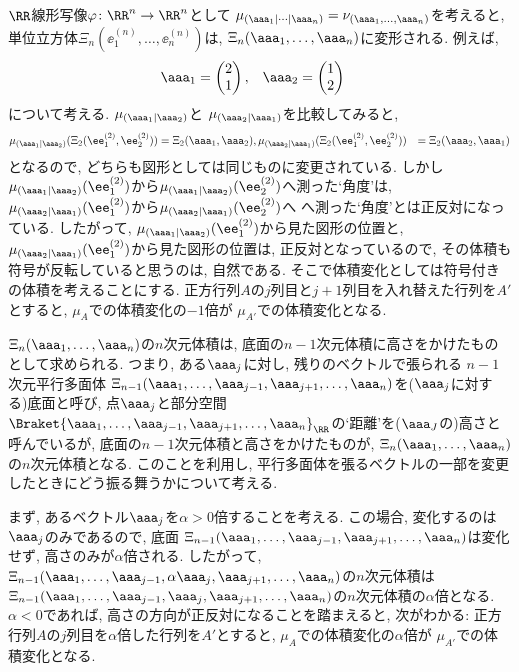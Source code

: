 $\RR$線形写像$\varphi\colon \RR^n\to\RR^n$として
$\mu_{(\aaa_1|\cdots|\aaa_n)}=\nu_{(\aaa_1,\ldots,\aaa_n)}$を考えると,
単位立方体$\Xi_n(\ee^{(n)}_1,\ldots,\ee^{(n)}_n)$は,
$\Xi_n(\aaa_1,\ldots,\aaa_n)$に変形される.
例えば,
\begin{align*}
\aaa_1&=\begin{pmatrix}2\\1\end{pmatrix},&\aaa_2&=\begin{pmatrix}1\\2\end{pmatrix}
\end{align*}
について考える.
$\mu_{(\aaa_1|\aaa_2)}$と
$\mu_{(\aaa_2|\aaa_1)}$を比較してみると,
\begin{align*}
\mu_{(\aaa_1|\aaa_2)}(\Xi_2(\ee^{(2)}_1,\ee^{(2)}_2))&=\Xi_2(\aaa_1,\aaa_2),
\mu_{(\aaa_2|\aaa_1)}(\Xi_2(\ee^{(2)}_1,\ee^{(2)}_2))&=\Xi_2(\aaa_2,\aaa_1)
\end{align*}
となるので, どちらも図形としては同じものに変更されている.
しかし
$\mu_{(\aaa_1|\aaa_2)}(\ee^{(2)}_1)$から$\mu_{(\aaa_1|\aaa_2)}(\ee^{(2)}_2)$へ測った`角度'は,
$\mu_{(\aaa_2|\aaa_1)}(\ee^{(2)}_1)$から$\mu_{(\aaa_2|\aaa_1)}(\ee^{(2)}_2)$へ
へ測った`角度'とは正反対になっている.
したがって, 
$\mu_{(\aaa_1|\aaa_2)}(\ee^{(2)}_1)$から見た図形の位置と,
$\mu_{(\aaa_2|\aaa_1)}(\ee^{(2)}_1)$から見た図形の位置は,
正反対となっているので,
その体積も符号が反転していると思うのは, 自然である.
そこで体積変化としては符号付きの体積を考えることにする.
正方行列$A$の$j$列目と$j+1$列目を入れ替えた行列を$A'$とすると,
$\mu_{A}$での体積変化の$-1$倍が
$\mu_{A'}$での体積変化となる.

$\Xi_n(\aaa_1,\ldots,\aaa_n)$の$n$次元体積は,
底面の$n-1$次元体積に高さをかけたものとして求められる.
つまり, ある$\aaa_j$に対し, 残りのベクトルで張られる
$n-1$次元平行多面体
$\Xi_{n-1}(\aaa_1,\ldots,\aaa_{j-1},\aaa_{j+1},\ldots,\aaa_n)$を($\aaa_j$に対する)底面と呼び, 点$\aaa_j$と部分空間$\Braket{\aaa_1,\ldots,\aaa_{j-1},\aaa_{j+1},\ldots,\aaa_n}_{\RR}$の`距離'を($\aaa_J$の)高さと呼んでいるが, 底面の$n-1$次元体積と高さをかけたものが,
$\Xi_n(\aaa_1,\ldots,\aaa_n)$の$n$次元体積となる.
このことを利用し,
平行多面体を張るベクトルの一部を変更したときにどう振る舞うかについて考える.

まず,
あるベクトル$\aaa_j$を$\alpha>0$倍することを考える.
この場合, 変化するのは$\aaa_j$のみであるので,
底面
$\Xi_{n-1}(\aaa_1,\ldots,\aaa_{j-1},\aaa_{j+1},\ldots,\aaa_n)$は変化せず,
高さのみが$\alpha$倍される.
したがって,
$\Xi_{n-1}(\aaa_1,\ldots,\aaa_{j-1},\alpha\aaa_{j},\aaa_{j+1},\ldots,\aaa_n)$の$n$次元体積は
$\Xi_{n-1}(\aaa_1,\ldots,\aaa_{j-1},\aaa_{j},\aaa_{j+1},\ldots,\aaa_n)$の$n$次元体積の$\alpha$倍となる.
$\alpha<0$であれば,
高さの方向が正反対になることを踏まえると, 次がわかる:
正方行列$A$の$j$列目を$\alpha$倍した行列を$A'$とすると,
$\mu_{A}$での体積変化の$\alpha$倍が
$\mu_{A'}$での体積変化となる.

